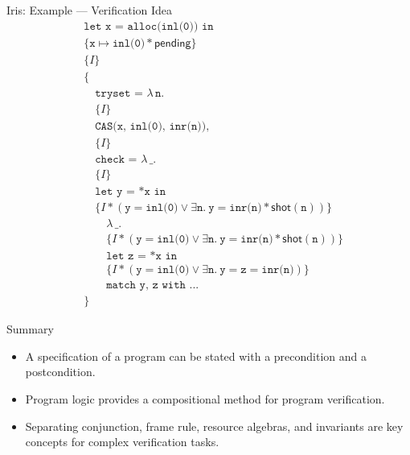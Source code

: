 \documentclass{beamer}
\newcommand{\pending}{\mathsf{pending}}
\newcommand{\shot}{\mathsf{shot}}
\begin{document}
\begin{frame}{Iris: Example --- Verification Idea}
  \scriptsize
  \[
  \begin{aligned}
    &\texttt{let x = alloc(inl(0)) in} \\
    &\{\texttt{x}\mapsto\texttt{inl(0)}*\pending\} \\
    &\{I\} \\
    &\{ \\
    &\quad \texttt{tryset = }\lambda\,\texttt{n}. \\
    &\quad \{I\} \\
    &\quad \texttt{CAS(x, inl(0), inr(n)),} \\
    &\quad \{I\} \\
    &\quad \texttt{check = }\lambda\,\texttt{\_}. \\
    &\quad \{I\} \\
    &\quad \texttt{let y = *x in} \\
    &\quad \{I*(\texttt{y}=\texttt{inl(0)}\lor
      \exists\texttt{n}.\ \texttt{y}=\texttt{inr(n)}*\shot(\texttt{n}))\} \\
    &\qquad \lambda\,\texttt{\_}. \\
    &\qquad \{I*(\texttt{y}=\texttt{inl(0)}\lor
      \exists\texttt{n}.\ \texttt{y}=\texttt{inr(n)}*\shot(\texttt{n}))\} \\
    &\qquad \texttt{let z = *x in} \\
    &\qquad \{I*(\texttt{y}=\texttt{inl(0)}\lor
      \exists\texttt{n}.\ \texttt{y}=\texttt{z}=\texttt{inr(n)})\} \\
    &\qquad \texttt{match y, z with ...} \\
    &\}
  \end{aligned}
  \]
\end{frame}

\begin{frame}{Summary}
  \begin{itemize}
    \item A specification of a program can be stated with a precondition and a postcondition.
    \item Program logic provides a compositional method for program verification.
    \item Separating conjunction, frame rule, resource algebras, and invariants are
      key concepts for complex verification tasks.
  \end{itemize}
\end{frame}
\end{document}
